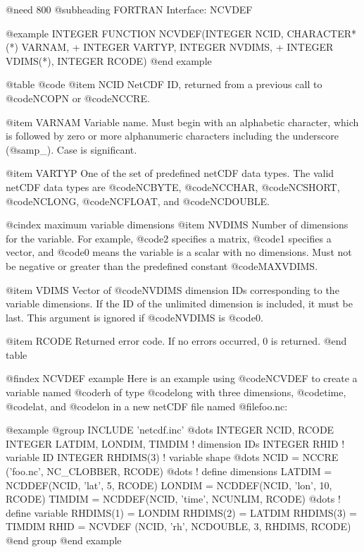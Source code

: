 @need 800
@subheading FORTRAN Interface:  NCVDEF

@example
      INTEGER FUNCTION NCVDEF(INTEGER NCID, CHARACTER*(*) VARNAM,
     +                        INTEGER VARTYP, INTEGER NVDIMS,
     +                        INTEGER VDIMS(*), INTEGER RCODE)
@end example

@table @code
@item NCID
NetCDF ID, returned from a previous call to @code{NCOPN} or @code{NCCRE}.

@item VARNAM
Variable name.  Must begin with an alphabetic character, which is
followed by zero or more alphanumeric characters including the underscore (@samp{_}).
Case is significant.

@item VARTYP
One of the set of predefined netCDF data types.  The valid netCDF data
types are @code{NCBYTE}, @code{NCCHAR}, @code{NCSHORT}, @code{NCLONG}, @code{NCFLOAT}, and @code{NCDOUBLE}.

@cindex maximum variable dimensions
@item NVDIMS
Number of dimensions for the variable.  For example, @code{2} specifies
a matrix, @code{1} specifies a vector, and @code{0} means the variable
is a scalar with no dimensions.  Must not be negative or greater than
the predefined constant @code{MAXVDIMS}.

@item VDIMS
Vector of @code{NVDIMS} dimension IDs corresponding to the variable
dimensions.  If the ID of the unlimited dimension is included, it
must be last.
This argument is ignored if @code{NVDIMS} is @code{0}.

@item RCODE
Returned error code.  If no errors occurred, 0 is returned.
@end table

@findex NCVDEF example
Here is an example using @code{NCVDEF} to create a variable named
@code{rh} of type @code{long} with three dimensions, @code{time},
@code{lat}, and @code{lon} in a new netCDF file named @file{foo.nc}:

@example
@group
      INCLUDE 'netcdf.inc'
         @dots{}
      INTEGER  NCID, RCODE
      INTEGER  LATDIM, LONDIM, TIMDIM  ! dimension IDs
      INTEGER  RHID                    ! variable ID
      INTEGER  RHDIMS(3)               ! variable shape
         @dots{}
      NCID = NCCRE ('foo.nc', NC_CLOBBER, RCODE)
         @dots{}
                                       ! define dimensions
      LATDIM = NCDDEF(NCID, 'lat', 5, RCODE)
      LONDIM = NCDDEF(NCID, 'lon', 10, RCODE)
      TIMDIM = NCDDEF(NCID, 'time', NCUNLIM, RCODE)
         @dots{}
                                       ! define variable
      RHDIMS(1) = LONDIM
      RHDIMS(2) = LATDIM
      RHDIMS(3) = TIMDIM
      RHID = NCVDEF (NCID, 'rh', NCDOUBLE, 3, RHDIMS, RCODE)
@end group
@end example

